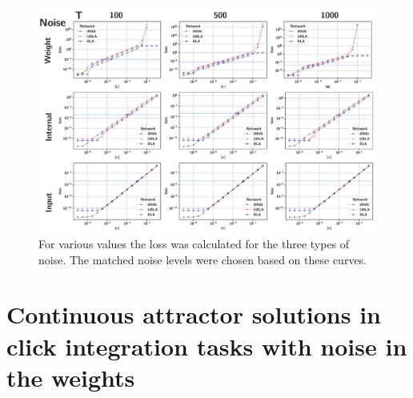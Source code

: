 \documentclass{article} %
\newcounter{ct}
\theoremstyle{definition}
\theoremstyle{remark}
\begin{document}
\begin{figure}[thbp]
     \centering
    \includegraphics[width=\textwidth]{matching_noise_3types_cont}
       \caption{For various values the loss was calculated for the three types of noise. The matched noise levels were chosen based on these curves.}
         \label{fig:matching_noise_3types_cont}
\end{figure}

\newpage
\section{Continuous attractor solutions in click integration tasks with noise in the weights}
\end{document}
